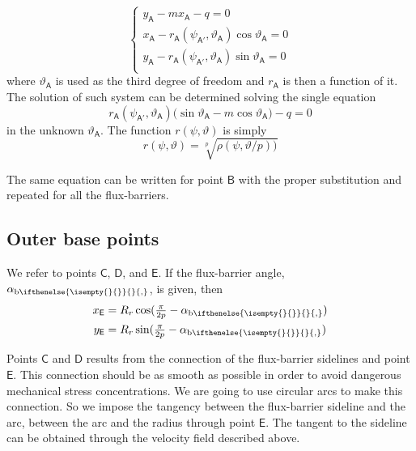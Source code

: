 \documentclass[b5paper,11pt,oneside,fleqn]{article}
\newcommand{\pt}[1]{\mathsf{#1}}
\newcommand{\te}{\vartheta}
\newcommand{\ab}[1][]{%
\alpha_{\textup{b}
\ifthenelse{\isempty{#1}{}}{}{,#1}%
}}
\newcommand{\pih}[1][]{\tfrac{\pi}{2#1}}
\begin{document}
\begin{equation}
\begin{cases}
y_\pt{A} - m x_\pt{A} - q = 0 \\
x_\pt{A} - r_\pt{A}(\psi_\pt{A'},\te_\pt{A}) \cos\te_\pt{A} = 0 \\
y_\pt{A} - r_\pt{A}(\psi_\pt{A'},\te_\pt{A}) \sin\te_\pt{A} = 0 \\
\end{cases}
\end{equation}
where $ \te_\pt{A} $ is used as the third degree of freedom and $ r_\pt{A} $ is
then a function of it.
The solution of such system can be determined solving the single equation
\begin{equation}
r_\pt{A}(\psi_\pt{A'},\te_\pt{A})
\bigl( \sin\te_\pt{A} - m \cos\te_\pt{A} \bigr) - q = 0
\end{equation}
in the unknown $ \te_\pt{A} $.
The function $ r(\psi,\te) $ is simply
\[
r(\psi,\te) = \sqrt[p]{ \rho(\psi,\te/p) \bigr) }
\]

The same equation can be written for point $ \pt{B} $ with the proper
substitution and repeated for all the flux-barriers.



\subsection{Outer base points}
We refer to points $ \pt{C} $, $ \pt{D} $, and $ \pt{E} $.
If the flux-barrier angle, $ \ab $, is given, then
\begin{equation}
\begin{aligned}
x_\pt{E} &= R_r \cos(\pih[p] - \ab) \\
y_\pt{E} &= R_r \sin(\pih[p] - \ab)
\end{aligned}
\end{equation}

Points $ \pt{C} $ and $ \pt{D} $ results from the connection of the
flux-barrier sidelines and point $ \pt{E} $.
This connection should be as smooth as possible in order to
avoid dangerous mechanical stress concentrations.
We are going to use circular arcs to make this connection.
So we impose the tangency between the flux-barrier sideline and the arc,
between the arc and the radius through point $ \pt{E} $.
The tangent to the sideline can be obtained through the velocity field
described above.
\end{document}
